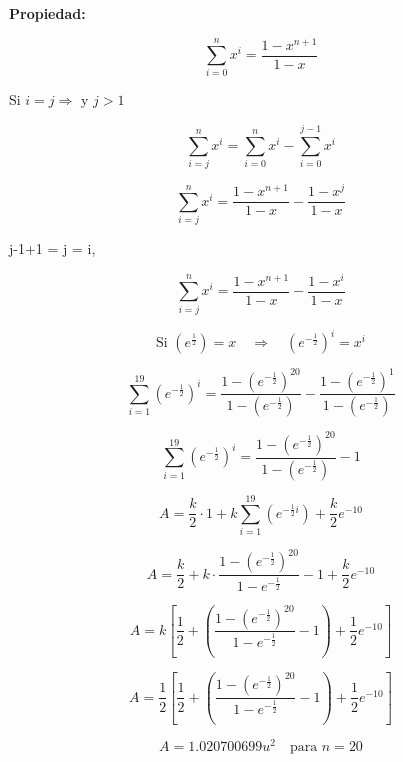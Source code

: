 \textbf{Propiedad:} 

\[
\sum_{i=0}^{n} x^i = \frac{1 - x^{n+1}}{1 - x}
\]

Si $i = j \Rightarrow$ y $j > 1$

\[
\sum_{i=j}^{n} x^i = \sum_{i=0}^{n} x^i - \sum_{i=0}^{j-1} x^i
\]

\[
\sum_{i=j}^{n} x^i = \frac{1 - x^{n+1}}{1 - x} - \frac{1 - x^j}{1 - x}
\]

 j-1+1 = j = i, 

\begin{equation}
\sum_{i=j}^{n} x^i = \frac{1 - x^{n+1}}{1 - x} - \frac{1 - x^i}{1 - x}
\label{eq:sumatoria}
\end{equation}

\[
\text{Si } \left( e^{\frac{1}{2}} \right) = x \quad \Rightarrow \quad \left( e^{-\frac{1}{2}} \right)^i = x^i
\]

\[
\sum_{i=1}^{19} \left( e^{-\frac{1}{2}} \right)^i = \frac{1 - \left(e^{-\frac{1}{2}}\right)^{20}}{1 - \left(e^{-\frac{1}{2}}\right)} - \frac{1 - \left(e^{-\frac{1}{2}}\right)^{1}}{1 - \left(e^{-\frac{1}{2}}\right)}
\]

\[
\sum_{i=1}^{19} \left( e^{-\frac{1}{2}} \right)^i = \frac{1 - \left(e^{-\frac{1}{2}}\right)^{20}}{1 - \left(e^{-\frac{1}{2}}\right)} - 1
\]

\[
A = \frac{k}{2} \cdot 1 + k \sum_{i=1}^{19} \left( e^{-\frac{1}{2} i} \right) + \frac{k}{2} e^{-10}
\]

\[
A = \frac{k}{2} + k \cdot \frac{1 - \left(e^{-\frac{1}{2}}\right)^{20}}{1 - e^{-\frac{1}{2}}} - 1 + \frac{k}{2} e^{-10}
\]

\[
A = k \left[ \frac{1}{2} + \left( \frac{1 - \left(e^{-\frac{1}{2}}\right)^{20}}{1 - e^{-\frac{1}{2}}} - 1 \right) + \frac{1}{2} e^{-10} \right]
\]

\[
A = \frac{1}{2} \left[ \frac{1}{2} + \left( \frac{1 - \left(e^{-\frac{1}{2}}\right)^{20}}{1 - e^{-\frac{1}{2}}} - 1 \right) + \frac{1}{2} e^{-10} \right]
\]

\[
A = 1.020700699 u^2 \quad \text{para } n = 20
\]
